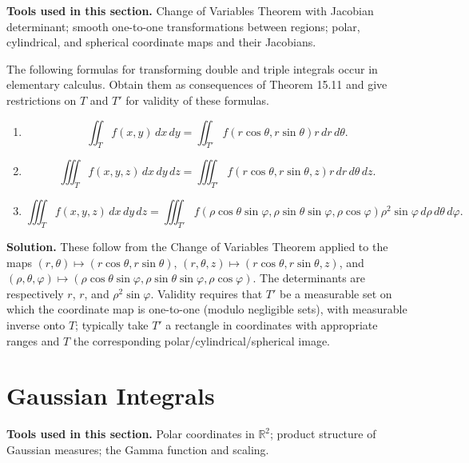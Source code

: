 \noindent\textbf{Tools used in this section.} Change of Variables Theorem with Jacobian determinant; smooth one-to-one transformations between regions; polar, cylindrical, and spherical coordinate maps and their Jacobians.

\begin{problembox}
The following formulas for transforming double and triple integrals occur in elementary calculus. Obtain them as consequences of Theorem 15.11 and give restrictions on \( T \) and \( T' \) for validity of these formulas.
\begin{enumerate}[label=(\alph*)]
\item \[ \iint_T f(x, y) \, dx \, dy = \iint_{T'} f(r \cos \theta, r \sin \theta)r \, dr \, d\theta.\]
\item \[ \iiint_T f(x, y, z) \, dx \, dy \, dz = \iiint_{T'} f(r \cos \theta, r \sin \theta, z)r \, dr \, d\theta \, dz.\]
\item \[ \iiint_T f(x, y, z) \, dx \, dy \, dz = \iiint_{T'} f(\rho \cos \theta \sin \varphi, \rho \sin \theta \sin \varphi, \rho \cos \varphi) \rho^2 \sin \varphi \, d\rho \, d\theta \, d\varphi.\]
\end{enumerate}
\end{problembox}

\noindent\textbf{Solution.}
These follow from the Change of Variables Theorem applied to the maps
\( (r,\theta)\mapsto (r\cos\theta, r\sin\theta) \),
\( (r,\theta,z)\mapsto (r\cos\theta, r\sin\theta, z) \), and
\( (\rho,\theta,\varphi)\mapsto (\rho\cos\theta\sin\varphi,\rho\sin\theta\sin\varphi,\rho\cos\varphi) \).
The determinants are respectively \(r\), \(r\), and \(\rho^2\sin\varphi\). Validity requires that \(T'\) be a measurable set on which the coordinate map is one-to-one (modulo negligible sets), with measurable inverse onto \(T\); typically take \(T'\) a rectangle in coordinates with appropriate ranges and \(T\) the corresponding polar/cylindrical/spherical image.

\section{Gaussian Integrals}

\noindent\textbf{Tools used in this section.} Polar coordinates in \(\mathbb{R}^2\); product structure of Gaussian measures; the Gamma function and scaling.

